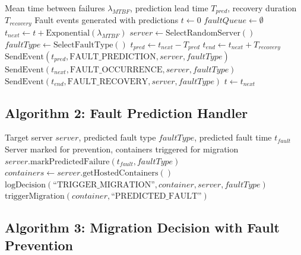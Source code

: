 \documentclass[12pt,a4paper]{article}
\begin{document}
\begin{algorithm}[H]
\caption{Fault Prediction and Injection}
\begin{algorithmic}[1]
\Require Mean time between failures $\lambda_{MTBF}$, prediction lead time $T_{pred}$, recovery duration $T_{recovery}$
\Ensure Fault events generated with predictions
\State $t \gets 0$ 
\State $faultQueue \gets \emptyset$ 
    \State $t_{next} \gets t + \text{Exponential}(\lambda_{MTBF})$ 
    \State $server \gets \text{SelectRandomServer}()$
    \State $faultType \gets \text{SelectFaultType}()$ 
    \State $t_{pred} \gets t_{next} - T_{pred}$ 
    \State $t_{end} \gets t_{next} + T_{recovery}$ 
    \State {}
    \State $\text{SendEvent}(t_{pred}, \text{FAULT\_PREDICTION}, server, faultType)$
    \State {}
    \State $\text{SendEvent}(t_{next}, \text{FAULT\_OCCURRENCE}, server, faultType)$
    \State {}
    \State $\text{SendEvent}(t_{end}, \text{FAULT\_RECOVERY}, server, faultType)$
    \State $t \gets t_{next}$
\EndWhile
\end{algorithmic}
\end{algorithm}

\subsection{Algorithm 2: Fault Prediction Handler}

\begin{algorithm}[H]
\caption{Handle Fault Prediction Event}
\begin{algorithmic}[1]
\Require Target server $server$, predicted fault type $faultType$, predicted fault time $t_{fault}$
\Ensure Server marked for prevention, containers triggered for migration
\State $server.\text{markPredictedFailure}(t_{fault}, faultType)$
\State $containers \gets server.\text{getHostedContainers}()$
    \State $\text{logDecision}(\text{``TRIGGER\_MIGRATION''}, container, server, faultType)$
    \State $\text{triggerMigration}(container, \text{``PREDICTED\_FAULT''})$
\EndFor
\end{algorithmic}
\end{algorithm}

\subsection{Algorithm 3: Migration Decision with Fault Prevention}
\end{document}
